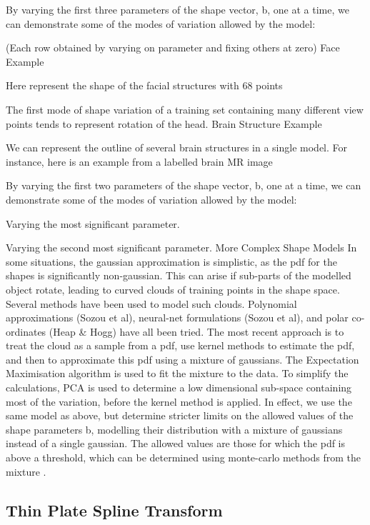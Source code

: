 By varying the first three parameters of the shape vector, b, one at a time, we can demonstrate some of the modes of variation allowed by the model:

(Each row obtained by varying on parameter and fixing others at zero)
Face Example

Here represent the shape of the facial structures with 68 points

The first mode of shape variation of a training set containing many different view points tends to represent rotation of the head.
Brain Structure Example

We can represent the outline of several brain structures in a single model.
For instance, here is an example from a labelled brain MR image

By varying the first two parameters of the shape vector, b, one at a time, we can demonstrate some of the modes of variation allowed by the model:

Varying the most significant parameter.

Varying the second most significant parameter.
More Complex Shape Models
In some situations, the gaussian approximation is simplistic, as the pdf for the shapes is significantly non-gaussian. This can arise if sub-parts of the modelled object rotate, leading to curved clouds of training points in the shape space. Several methods have been used to model such clouds. Polynomial approximations (Sozou et al), neural-net formulations (Sozou et al), and polar co-ordinates (Heap & Hogg) have all been tried. The most recent approach is to treat the cloud as a sample from a pdf, use kernel methods to estimate the pdf, and then to approximate this pdf using a mixture of gaussians. The Expectation Maximisation algorithm is used to fit the mixture to the data. To simplify the calculations, PCA is used to determine a low dimensional sub-space containing most of the variation, before the kernel method is applied. In effect, we use the same model as above, but determine stricter limits on the allowed values of the shape parameters b, modelling their distribution with a mixture of gaussians instead of a single gaussian. The allowed values are those for which the pdf is above a threshold, which can be determined using monte-carlo methods from the mixture .


\subsection{Thin Plate Spline Transform}
